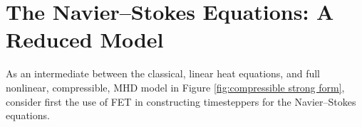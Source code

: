\section{The Navier--Stokes Equations: A Reduced Model}\label{cha:Navier--Stokes}
    As an intermediate between the classical, linear heat equations, and full nonlinear, compressible, MHD model in Figure \ref{fig:compressible strong form}, consider first the use of FET in constructing timesteppers for the Navier--Stokes equations.


    
    